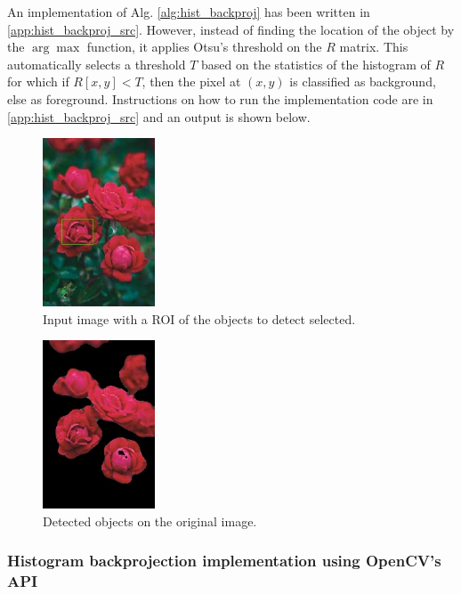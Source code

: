 \documentclass[a4paper]{article}
\begin{document}
An implementation of Alg. \ref{alg:hist_backproj} has been written in \ref{app:hist_backproj_src}. However, instead of finding the location of the object by the $\arg \max$ function, it applies Otsu's threshold on the $R$ matrix. This automatically selects a threshold $T$ based on the statistics of the histogram of $R$ for which if $R[x,y] < T$, then the pixel at $(x,y)$ is classified as background, else as foreground. Instructions on how to run the implementation code are in \ref{app:hist_backproj_src} and an output is shown below.
\begin{multicols}{2}
    \begin{figure}[H]
        \centering
        \includegraphics[height=5cm]{img/hist_backproj/rect.jpg}
        \caption{Input image with a ROI of the objects to detect selected.}
    \end{figure}
    \columnbreak
    \begin{figure}[H]
        \centering
        \includegraphics[height=5cm]{img/hist_backproj/res.jpg}
        \caption{Detected objects on the original image.}
    \end{figure}
\end{multicols}



\subsubsection{Histogram backprojection implementation using OpenCV's API}
\end{document}
